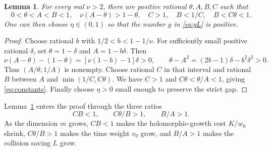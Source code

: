 \documentclass[11pt]{article}
\newtheorem{lemma}[theorem]{Lemma}
\theoremstyle{definition}
\theoremstyle{remark}
\numberwithin{equation}{section}
\begin{document}
\begin{lemma}\label{lem:constants}
For every real \(\nu>2\), there are positive rational
\(\theta,A,B,C\) such that
\begin{equation}\label{eq:constants}
 0<\theta<A<B<1,\quad \nu(A-\theta)>1-\theta,
 \quad C>1,\quad B<1/C,\quad B<C\theta<1.
\end{equation}
One can then choose \(\eta\in(0,1)\) so that the number \(g\) in
\eqref{eq:gL} is positive.
\end{lemma}
\begin{proof}
Choose rational \(b\) with \(1/2<b<1-1/\nu\). For sufficiently
small positive rational \(\delta\), set
\(\theta=1-\delta\) and \(A=1-b\delta\). Then
\[
 \nu(A-\theta)-(1-\theta)=[\nu(1-b)-1]\delta>0,
 \qquad
 \theta-A^2=(2b-1)\delta-b^2\delta^2>0.
\]
Thus \((A/\theta,1/A)\) is nonempty. Choose rational \(C\) in that
interval and rational \(B\) between \(A\) and
\(\min(1/C,C\theta)\). We have \(C>1\) and
\(C\theta<\theta/A<1\), giving \eqref{eq:constants}.
Finally choose \(\eta>0\) small enough to preserve the strict gap.
\end{proof}

Lemma~\ref{lem:constants} enters the proof through the three ratios
\begin{equation}\label{eq:ratios}
 CB<1,\qquad C\theta/B>1,\qquad B/A>1.
\end{equation}
As the dimension \(m\) grows, \(CB<1\) makes the holomorphic-growth
cost \(K/w_0\) shrink, \(C\theta/B>1\) makes the time weight \(v_0\)
grow, and \(B/A>1\) makes the collision saving \(L\) grow.
\end{document}
